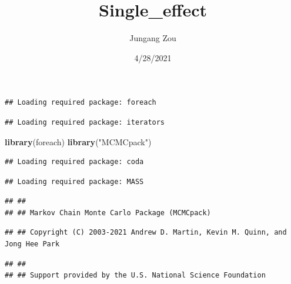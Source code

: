 \documentclass[
]{article}
\title{Single\_effect}
\author{Jungang Zou}
\date{4/28/2021}
\newenvironment{Shaded}{\begin{snugshade}}{\end{snugshade}}
\newcommand{\CommentTok}[1]{\textcolor[rgb]{0.56,0.35,0.01}{\textit{#1}}}
\newcommand{\DataTypeTok}[1]{\textcolor[rgb]{0.13,0.29,0.53}{#1}}
\newcommand{\KeywordTok}[1]{\textcolor[rgb]{0.13,0.29,0.53}{\textbf{#1}}}
\newcommand{\NormalTok}[1]{#1}
\newcommand{\OperatorTok}[1]{\textcolor[rgb]{0.81,0.36,0.00}{\textbf{#1}}}
\newcommand{\OtherTok}[1]{\textcolor[rgb]{0.56,0.35,0.01}{#1}}
\newcommand{\StringTok}[1]{\textcolor[rgb]{0.31,0.60,0.02}{#1}}
\begin{document}
\maketitle

\begin{Shaded}
\end{Shaded}

\begin{verbatim}
## Loading required package: foreach
\end{verbatim}

\begin{verbatim}
## Loading required package: iterators
\end{verbatim}

\begin{Shaded}
\begin{Highlighting}[]
\KeywordTok{library}\NormalTok{(foreach)}
\KeywordTok{library}\NormalTok{(}\StringTok{"MCMCpack"}\NormalTok{)}
\end{Highlighting}
\end{Shaded}

\begin{verbatim}
## Loading required package: coda
\end{verbatim}

\begin{verbatim}
## Loading required package: MASS
\end{verbatim}

\begin{verbatim}
## ##
## ## Markov Chain Monte Carlo Package (MCMCpack)
\end{verbatim}

\begin{verbatim}
## ## Copyright (C) 2003-2021 Andrew D. Martin, Kevin M. Quinn, and Jong Hee Park
\end{verbatim}

\begin{verbatim}
## ##
## ## Support provided by the U.S. National Science Foundation
\end{verbatim}
\end{document}
